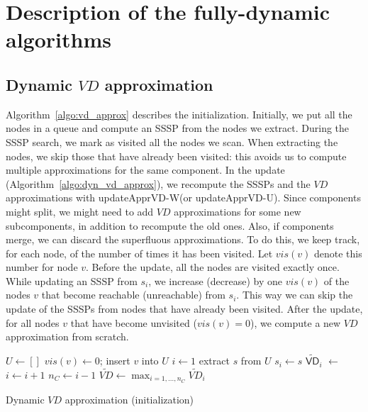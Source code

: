 \documentclass[english]{llncs}
\newcommand{\vd}{$\mathit{VD}$\xspace}
\newcommand{\vda}{$\tilde{\mathit{VD}}$\xspace}
\newcommand{\upvd}{\textsf{updateApprVD-W}\xspace}
\newcommand{\upvdu}{\textsf{updateApprVD-U}\xspace}
\begin{document}
\pagebreak
\appendix

\section{Description of the fully-dynamic algorithms}
\label{sec:pseudocodes}

\renewcommand{\floatpagefraction}{0.99}
\subsection{Dynamic \vd approximation}
Algorithm~\ref{algo:vd_approx} describes the initialization. Initially, we put all the nodes in a queue and compute an SSSP from the nodes we extract. During the SSSP search, we mark as visited all the nodes we scan. When extracting the nodes, we skip those that have already been visited: this avoids us to compute multiple approximations for the same component. 
In the update (Algorithm~\ref{algo:dyn_vd_approx}), we recompute the SSSPs and the \vd approximations with \upvd (or \upvdu). Since components might split, we might need to add \vd approximations for some new subcomponents, in addition to recompute the old ones. Also, if components merge, we can discard the superfluous approximations. To do this, we keep track, for each node, of the number of times it has been visited. Let $vis(v)$ denote this number for node $v$. Before the update, all the nodes are visited exactly once. While updating an SSSP from $s_i$, we increase (decrease) by one $vis(v)$ of the nodes $v$ that become reachable (unreachable) from $s_i$. This way we can skip the update of the SSSPs from nodes that have already been visited. After the update, for all nodes $v$ that have become unvisited ($vis(v)=0$), we compute a new \vd approximation from scratch.

\begin{algorithm}[h]
 \begin{footnotesize}
\LinesNumbered
{}
$U \leftarrow []$\;
{
		$vis(v)\leftarrow 0$; insert $v$ into $U$\; \label{initvd:queue}
}
$i \leftarrow 1$\;
{\label{initvd:newsamples1}
	extract $s$ from $U$\;
	{
		 $s_i \leftarrow s$\;
		$\tilde{\textsf{VD}}_i$ $\leftarrow$ \;
		$i \leftarrow i+1$\;
	}
}\label{initvd:newsamples2}
$n_C \leftarrow i-1$\;
\vda $\leftarrow \max_{i=1,...,n_C} \tilde{\mathit{VD}}_i$\;
\Return{\vda}
\end{footnotesize}
\caption{Dynamic \vd approximation (initialization)}
\label{algo:vd_approx}
\end{algorithm}
\end{document}
